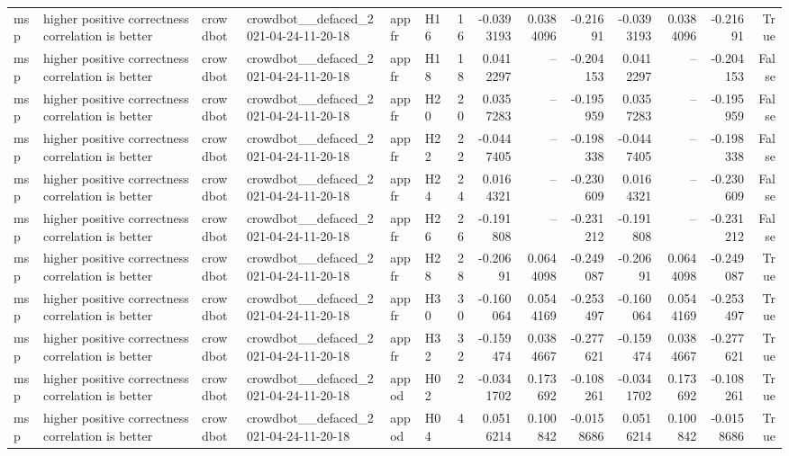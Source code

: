 \begin{longtable}{llllllrrrrrrrr}
msp & higher positive correctness correlation is better & crowdbot & crowdbot\_\_defaced\_2021-04-24-11-20-18 & appfr & H16 & 16 & -0.0393193 & 0.0384096 & -0.21691 & -0.0393193 & 0.0384096 & -0.21691 & True \\
msp & higher positive correctness correlation is better & crowdbot & crowdbot\_\_defaced\_2021-04-24-11-20-18 & appfr & H18 & 18 & 0.0412297 & -- & -0.204153 & 0.0412297 & -- & -0.204153 & False \\
msp & higher positive correctness correlation is better & crowdbot & crowdbot\_\_defaced\_2021-04-24-11-20-18 & appfr & H20 & 20 & 0.0357283 & -- & -0.195959 & 0.0357283 & -- & -0.195959 & False \\
msp & higher positive correctness correlation is better & crowdbot & crowdbot\_\_defaced\_2021-04-24-11-20-18 & appfr & H22 & 22 & -0.0447405 & -- & -0.198338 & -0.0447405 & -- & -0.198338 & False \\
msp & higher positive correctness correlation is better & crowdbot & crowdbot\_\_defaced\_2021-04-24-11-20-18 & appfr & H24 & 24 & 0.0164321 & -- & -0.230609 & 0.0164321 & -- & -0.230609 & False \\
msp & higher positive correctness correlation is better & crowdbot & crowdbot\_\_defaced\_2021-04-24-11-20-18 & appfr & H26 & 26 & -0.191808 & -- & -0.231212 & -0.191808 & -- & -0.231212 & False \\
msp & higher positive correctness correlation is better & crowdbot & crowdbot\_\_defaced\_2021-04-24-11-20-18 & appfr & H28 & 28 & -0.20691 & 0.0644098 & -0.249087 & -0.20691 & 0.0644098 & -0.249087 & True \\
msp & higher positive correctness correlation is better & crowdbot & crowdbot\_\_defaced\_2021-04-24-11-20-18 & appfr & H30 & 30 & -0.160064 & 0.0544169 & -0.253497 & -0.160064 & 0.0544169 & -0.253497 & True \\
msp & higher positive correctness correlation is better & crowdbot & crowdbot\_\_defaced\_2021-04-24-11-20-18 & appfr & H32 & 32 & -0.159474 & 0.0384667 & -0.277621 & -0.159474 & 0.0384667 & -0.277621 & True \\
msp & higher positive correctness correlation is better & crowdbot & crowdbot\_\_defaced\_2021-04-24-11-20-18 & appod & H02 & 2 & -0.0341702 & 0.173692 & -0.108261 & -0.0341702 & 0.173692 & -0.108261 & True \\
msp & higher positive correctness correlation is better & crowdbot & crowdbot\_\_defaced\_2021-04-24-11-20-18 & appod & H04 & 4 & 0.0516214 & 0.100842 & -0.0158686 & 0.0516214 & 0.100842 & -0.0158686 & True \\

\end{longtable}
